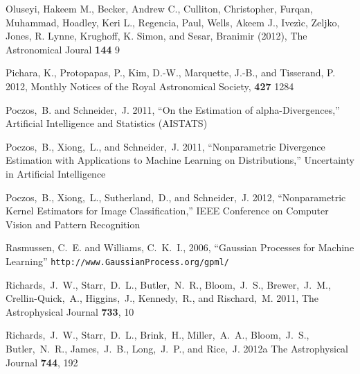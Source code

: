 \documentclass[prd,nofootbib,floatfix,11pt,tightenlines]{revtex4}
\begin{document}
\begin{thebibliography}{99}
Oluseyi, Hakeem M., Becker, Andrew C., Culliton, Christopher, Furqan, Muhammad,
Hoadley, Keri L., Regencia, Paul, Wells, Akeem J., Ivez\`ic, Zeljko, Jones, R.
Lynne, Krughoff, K. Simon, and Sesar, Branimir (2012), The Astronomical Joural
{\bf 144} 9

Pichara, K., Protopapas, P., Kim, D.-W., Marquette, J.-B., and Tisserand, P.
2012, Monthly Notices of the Royal Astronomical Society, {\bf 427} 1284

Poczos,~B. and Schneider,~J. 2011, ``On the Estimation of alpha-Divergences,''
Artificial Intelligence and Statistics (AISTATS)

Poczos,~B., Xiong,~L., and Schneider,~J. 2011, ``Nonparametric Divergence Estimation with
Applications to Machine Learning on Distributions,''  Uncertainty in Artificial
Intelligence

Poczos,~B., Xiong,~L., Sutherland,~D., and Schneider,~J. 2012,
``Nonparametric Kernel Estimators for Image Classification,''
IEEE Conference on Computer Vision and Pattern Recognition


Rasmussen, C.~E. and Williams, C.~K.~I., 2006, ``Gaussian
Processes for Machine Learning''
\verb|http://www.GaussianProcess.org/gpml/|


Richards,~J.~W., Starr,~D.~L., Butler,~N.~R., Bloom,~J.~S., Brewer,~J.~M.,
Crellin-Quick,~A., Higgins,~J., Kennedy,~R., and Rischard,~M. 2011,
The Astrophysical Journal {\bf 733}, 10

Richards,~J.~W., Starr,~D.~L., Brink,~H., Miller,~A.~A., Bloom,~J.~S.,
Butler,~N.~R., James,~J.~B., Long,~J.~P., and Rice,~J. 2012a
The Astrophysical Journal {\bf 744}, 192


\end{thebibliography}
\end{document}
